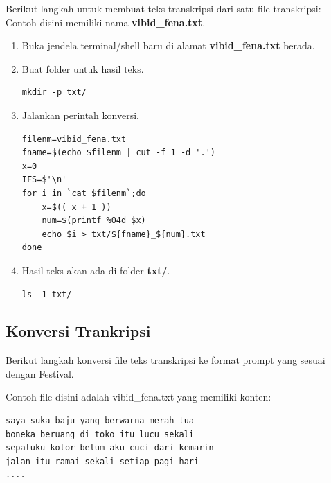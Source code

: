 \documentclass[12pt,]{article}
\begin{document}
	Berikut langkah untuk membuat teks transkripsi dari satu file transkripsi:
	Contoh disini memiliki nama \textbf{vibid\_fena.txt}.
	\begin{enumerate}
		\item Buka jendela terminal/shell baru di alamat \textbf{vibid\_fena.txt} berada.
		
		\item Buat folder untuk hasil teks.
		\begin{verbatim}
mkdir -p txt/
		\end{verbatim}
		
		\item Jalankan perintah konversi.
		\begin{verbatim}
filenm=vibid_fena.txt
fname=$(echo $filenm | cut -f 1 -d '.')
x=0
IFS=$'\n'
for i in `cat $filenm`;do
	x=$(( x + 1 ))
	num=$(printf %04d $x)
	echo $i > txt/${fname}_${num}.txt
done
		\end{verbatim}
		
		\item Hasil teks akan ada di folder \textbf{txt/}.
		\begin{verbatim}
ls -1 txt/
		\end{verbatim}
		
	\end{enumerate}
	
	\newpage
	\subsection{Konversi Trankripsi}
	
	Berikut langkah konversi file teks transkripsi ke format prompt yang sesuai dengan Festival.
	
	Contoh file disini adalah vibid\_fena.txt yang memiliki konten:
	\begin{verbatim}
saya suka baju yang berwarna merah tua
boneka beruang di toko itu lucu sekali
sepatuku kotor belum aku cuci dari kemarin
jalan itu ramai sekali setiap pagi hari
....
	\end{verbatim}
	
\end{document}
